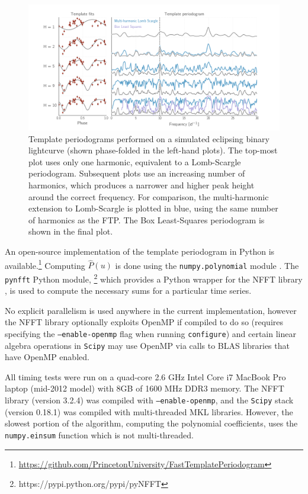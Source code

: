 \documentclass[iop]{emulateapj}
\begin{document}
\begin{figure}
    \centering
    \includegraphics[width=\textwidth]{plots/templates_and_periodograms.png}
    \caption{\label{fig:tempsandpdgs} Template periodograms performed on a simulated eclipsing
            binary lightcurve (shown phase-folded in the left-hand plots). The top-most plot 
            uses only one harmonic, equivalent to a Lomb-Scargle periodogram. Subsequent plots
            use an increasing number of harmonics, which produces a narrower and higher peak
            height around the correct frequency. For comparison, the multi-harmonic extension 
            to Lomb-Scargle is plotted in blue, using the same number of harmonics as the FTP.
            The Box Least-Squares \citep{Kovacs_2002} periodogram is shown in the final plot.}
\end{figure}

An open-source implementation of the template periodogram in Python is
available.\footnote{\url{https://github.com/PrincetonUniversity/FastTemplatePeriodogram}} 
Computing $\hat{P}(u)$ is done using the \texttt{numpy.polynomial} module 
\citep{Scipy}. The \texttt{pynfft} Python module,
\footnote{https://pypi.python.org/pypi/pyNFFT} which provides a Python 
wrapper for the NFFT library \citep{NFFT}, is used to compute the necessary 
sums for a particular time series.

No explicit parallelism is used anywhere in the current implementation, 
however the NFFT library optionally exploits OpenMP if compiled
to do so (requires specifying the \texttt{--enable-openmp} flag
when running \texttt{configure}) and certain linear algebra operations
in \texttt{Scipy} may use OpenMP via calls to BLAS libraries that
have OpenMP enabled.

All timing tests were run on a quad-core 2.6 GHz Intel Core i7 MacBook 
Pro laptop (mid-2012 model) with 8GB of 1600 MHz DDR3 memory. The NFFT
library (version 3.2.4) was compiled with \texttt{--enable-openmp}, and
the \texttt{Scipy} stack (version 0.18.1) was compiled with multi-threaded MKL libraries.
However, the slowest portion of the algorithm, computing the polynomial
coefficients, uses the \texttt{numpy.einsum} function which is not
multi-threaded. 
\end{document}
